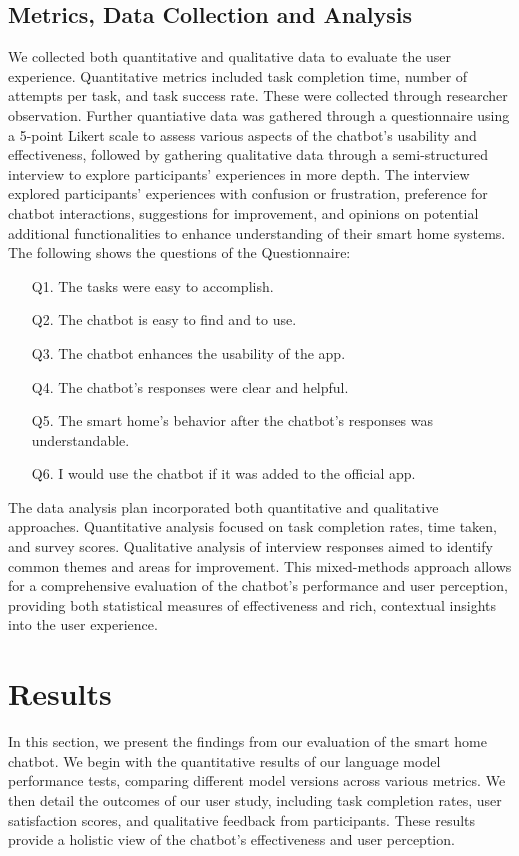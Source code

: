 \subsection{Metrics, Data Collection and Analysis}
We collected both quantitative and qualitative data to evaluate the user experience. Quantitative metrics included task completion time, number of attempts per task, and task success rate. These were collected through researcher observation. Further quantiative data was gathered through a questionnaire using a 5-point Likert scale to assess various aspects of the chatbot's usability and effectiveness, followed by gathering qualitative data through a semi-structured interview to explore participants' experiences in more depth. The interview explored participants' experiences with confusion or frustration, preference for chatbot interactions, suggestions for improvement, and opinions on potential additional functionalities to enhance understanding of their smart home systems.
The following shows the questions of the Questionnaire:
\begin{itemize}
    \item[Q1.] The tasks were easy to accomplish.
    \item[Q2.] The chatbot is easy to find and to use.
    \item[Q3.] The chatbot enhances the usability of the app.
    \item[Q4.] The chatbot's responses were clear and helpful.
    \item[Q5.] The smart home's behavior after the chatbot's responses was understandable.
    \item[Q6.] I would use the chatbot if it was added to the official app.
\end{itemize}

The data analysis plan incorporated both quantitative and qualitative approaches. Quantitative analysis focused on task completion rates, time taken, and survey scores. Qualitative analysis of interview responses aimed to identify common themes and areas for improvement. This mixed-methods approach allows for a comprehensive evaluation of the chatbot's performance and user perception, providing both statistical measures of effectiveness and rich, contextual insights into the user experience.


\section{Results}
\label{sec:results}
In this section, we present the findings from our evaluation of the smart home chatbot. We begin with the quantitative results of our language model performance tests, comparing different model versions across various metrics. We then detail the outcomes of our user study, including task completion rates, user satisfaction scores, and qualitative feedback from participants. These results provide a holistic view of the chatbot's effectiveness and user perception.

